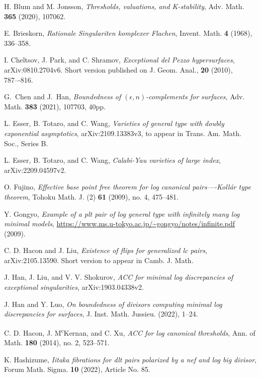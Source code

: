 \documentclass[11pt]{amsart}
\numberwithin{equation}{section}
\theoremstyle{definition}
\theoremstyle{definition}
\theoremstyle{definition}
\begin{document}
\begin{thebibliography}{ABCDE}
 H. Blum and M. Jonsson, \textit{Thresholds, valuations, and K-stability}, Adv. Math. \textbf{365} (2020), 107062.

 E. Brieskorn, \textit{Rationale Singulariten komplexer Flachen}, Invent. Math. \textbf{4} (1968), 336--358.

 I. Cheltsov, J. Park, and C. Shramov, \textit{Exceptional del Pezzo hypersurfaces}, arXiv:0810.2704v6. Short version published on J. Geom. Anal., \textbf{20} (2010), 787–-816.

 G.~Chen and J.~Han, \textit{Boundedness of $(\epsilon, n)$-complements for surfaces}, Adv. Math. \textbf{383} (2021), 107703, 40pp.

 L. Esser, B. Totaro, and C. Wang, \textit{Varieties of general type with doubly exponential asymptotics}, arXiv:2109.13383v3, to appear in Trans. Am. Math. Soc., Series B.

 L. Esser, B. Totaro, and C. Wang, \textit{Calabi-Yau varieties of large index}, arXiv:2209.04597v2.

 O. Fujino, \textit{Effective base point free theorem for log canonical pairs—-Koll\'ar type theorem}, Tohoku Math. J. (2) \textbf{61} (2009), no. 4, 475--481.

 Y. Gongyo, \textit{Example of a plt pair of log general type with infinitely many log minimal models}, \url{https://www.ms.u-tokyo.ac.jp/~gongyo/notes/infinite.pdf} (2009).

 C. D. Hacon and J. Liu, \textit{Existence of flips for generalized lc pairs}, arXiv:2105.13590. Short version to appear in  Camb. J. Math.

 J. Han, J. Liu, and V. V. Shokurov, \textit{ACC for minimal log discrepancies of exceptional singularities}, arXiv:1903.04338v2.

 J. Han and Y. Luo,
\textit{On boundedness of divisors computing minimal log discrepancies for surfaces}, J. Inst. Math. Jussieu. (2022), 1--24.


 C. D. Hacon, J. M\textsuperscript{c}Kernan, and C. Xu, \textit{ACC for log canonical thresholds}, Ann. of Math. \textbf{180} (2014), no. 2, 523--571.

 K. Hashizume, \textit{Iitaka fibrations for dlt pairs polarized by a nef and log big divisor}, Forum Math. Sigma. \textbf{10} (2022), Article No. 85.


\end{thebibliography}
\end{document}
